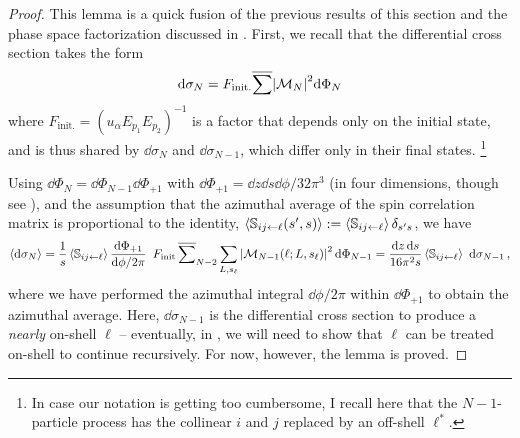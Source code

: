 \begin{proof}
    This lemma is a quick fusion of the previous results of this section and the  phase space factorization discussed in .
    First, we recall that the differential cross section takes the form
    \begin{align}
        \dd \sigma_N
        =
        F_\text{init.}
        \overline{\sum}\abs{\mathcal{M}_N}^2
        \dd \Phi_N
    \end{align}
    where \(F_\text{init.} = (u_\alpha E_{p_1} E_{p_2})^{-1}\) is a factor that depends only on the initial state, and is thus shared by \(\dd\sigma_{N}\) and \(\dd\sigma_{N-1}\), which differ only in their final states.%
    \footnote{
        In case our notation is getting too cumbersome, I recall here that the \(N-1\)-particle process has the collinear \(i\) and \(j\) replaced by an off-shell \(\ell^*\).
    }

    Using \(\dd\Phi_N = \dd\Phi_{N-1} \dd\Phi_{+1}\) with \(\dd\Phi_{+1} = \dd z \dd s \dd \phi / 32 \pi^3\) (in four dimensions, though see ), and the assumption that the azimuthal average of the spin correlation matrix is proportional to the identity, \(\left\langle \mathbb{S}_{ij\leftarrow \ell}(s',s) \right\rangle := \left\langle\mathbb{S}_{ij\leftarrow \ell}\right\rangle \delta_{s' s}\), we have
    \begin{align}
        \left\langle \dd \sigma_N\right\rangle
        =
        \frac{1}{s}
        \left\langle\mathbb{S}_{ij\leftarrow \ell}\right\rangle
        \frac{\dd\Phi_{+1}}{\dd\phi / 2\pi}
        \,\,\,
        F_{\text{init}}
        \,
        \overline{\sum}_{N-2}
        \sum_{L, s_\ell}
        \abs{\mathcal{M}_{N-1}(\ell; L, s_\ell)}^2
        \,
        \dd\Phi_{N-1}
        =
        \frac{\dd z \, \dd s}{16 \pi^2 s}
        \left\langle\mathbb{S}_{ij\leftarrow \ell}\right\rangle
        \,\,
        \dd\sigma_{N-1}
        \,,
    \end{align}
    where we have performed the azimuthal integral \(\dd\phi/2\pi\) within \(\dd\Phi_{+1}\) to obtain the azimuthal average.
    Here, \(\dd\sigma_{N-1}\) is the differential cross section to produce a \textit{nearly} on-shell \(\ell\) -- eventually, in , we will need to show that \(\ell\) can be treated on-shell to continue recursively.
    For now, however, the lemma is proved.
\end{proof}


